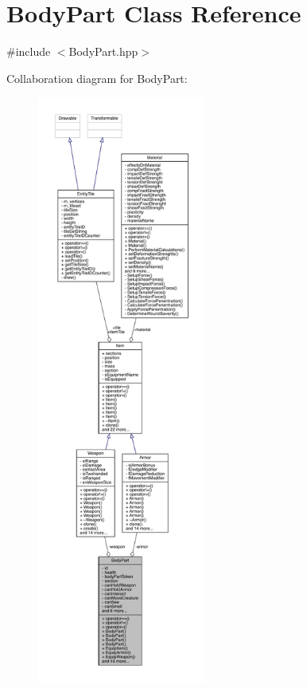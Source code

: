 \hypertarget{class_body_part}{}\section{Body\+Part Class Reference}
\label{class_body_part}


{\ttfamily \#include $<$Body\+Part.\+hpp$>$}



Collaboration diagram for Body\+Part\+:
\nopagebreak
\begin{figure}[H]
\begin{center}
\leavevmode
\includegraphics[height=550pt]{class_body_part__coll__graph}
\end{center}
\end{figure}
